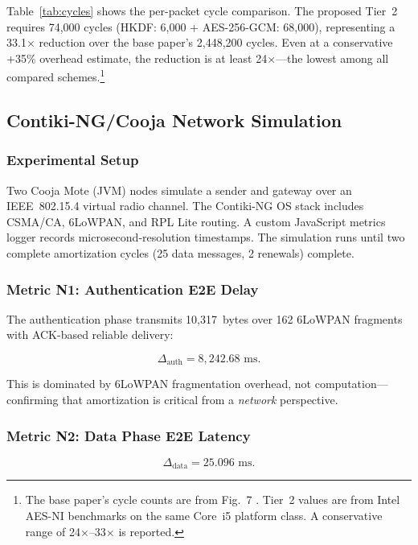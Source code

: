 \documentclass[conference]{IEEEtran}
\begin{document}
Table~\ref{tab:cycles} shows the per-packet cycle comparison. The
proposed Tier~2 requires 74,000 cycles (HKDF: 6,000 + AES-256-GCM:
68,000), representing a 33.1$\times$ reduction over the base
paper's 2,448,200 cycles. Even at a conservative +35\% overhead
estimate, the reduction is at least 24$\times$---the lowest among
all compared schemes.\footnote{The base paper's cycle counts are from
Fig.~7 \cite{kumari2022}. Tier~2 values are from Intel AES-NI
benchmarks on the same Core~i5 platform class. A conservative range
of 24$\times$--33$\times$ is reported.}

\subsection{Contiki-NG/Cooja Network Simulation}

\subsubsection{Experimental Setup}

Two Cooja Mote (JVM) nodes simulate a sender and gateway over an
IEEE~802.15.4 virtual radio channel. The Contiki-NG OS stack includes
CSMA/CA, 6LoWPAN, and RPL Lite routing. A custom JavaScript metrics
logger records microsecond-resolution timestamps. The simulation runs
until two complete amortization cycles (25 data messages, 2 renewals)
complete.

\subsubsection{Metric N1: Authentication E2E Delay}

The authentication phase transmits 10,317~bytes over 162 6LoWPAN
fragments with ACK-based reliable delivery:

\begin{equation}
\Delta_{\text{auth}} = 8{,}242.68 \text{ ms.}
\label{eq:authdelay}
\end{equation}

This is dominated by 6LoWPAN fragmentation overhead, not
computation---confirming that amortization is critical from a
\emph{network} perspective.

\subsubsection{Metric N2: Data Phase E2E Latency}

\begin{equation}
\Delta_{\text{data}} = 25.096 \text{ ms.}
\label{eq:datadelay}
\end{equation}
\end{document}
